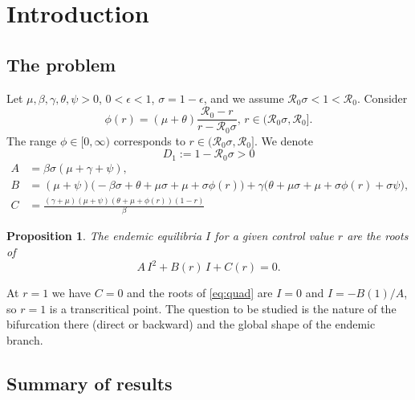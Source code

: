 \documentclass[11pt]{article}
\newtheorem{proposition}[lemma]{Proposition}
\theoremstyle{remark}
\newcommand{\R}{\mathcal R_0}
\begin{document}
\newpage

\section{Introduction}

\subsection{The problem}

Let $\mu,\beta,\gamma,\theta,\psi>0$, $0<\epsilon<1$, $\sigma=1-\epsilon$, and  we assume $\R \sigma < 1 <  \R$. Consider
\begin{equation}
\phi(r)=(\mu+\theta)\frac{\R-r}{r-\R\sigma}, \, r \in (\R \sigma, \R].
\end{equation}
The range $\phi\in[0,\infty)$ corresponds to $r\in(\R\sigma,\R]$.  We denote
\begin{equation}
   D_1:=1-\R\sigma> 0  %
\label{eq:hyp}
\end{equation}
\begin{align*}
A &= \beta\sigma(\mu+\gamma+\psi),\\
B &= (\mu+\psi)\big(-\beta\sigma+\theta+\mu\sigma+\mu+\sigma\phi(r)\big)+\gamma\big(\theta+\mu\sigma+\mu+\sigma\phi(r)+\sigma\psi\big),\\
C &= \frac{(\gamma+\mu)(\mu+\psi)(\theta+\mu+\phi(r))(1-r)}{\beta}%
\end{align*}

\begin{proposition}
The endemic equilibria $I$ for a given control value $r$ are the roots of
\begin{equation}
A\,I^2+B(r)\,I+C(r)=0 .
\label{eq:quad}
\end{equation}
\end{proposition}

\noindent At $r=1$ we have $C=0$ and the roots of \eqref{eq:quad} are $I=0$ and $I=-B(1)/A$, so $r=1$ is a transcritical point. 
The question  to be studied is the nature of the bifurcation there (direct or backward) and the global shape of the endemic branch.

\subsection{Summary of results}
\end{document}
